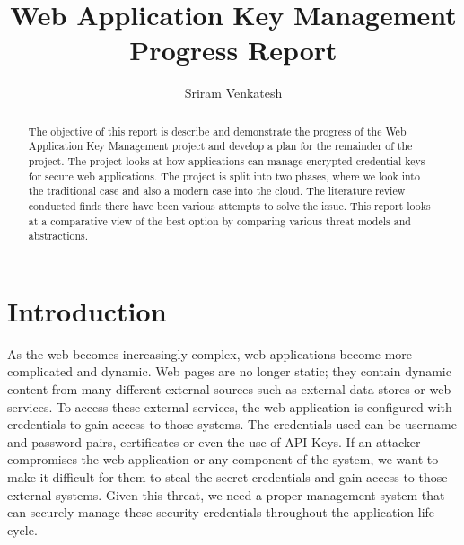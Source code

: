 \documentclass[11pt, a4paper, notitlepage]{article}
\title{Web Application Key Management Progress Report}
\author{Sriram Venkatesh}
\date{}
\begin{document}
\frontmatter


\begin{abstract}
The objective of this report is describe and demonstrate the progress of the Web Application Key Management project and develop a plan for the remainder of the project. The project looks at how applications can manage encrypted credential keys for secure web applications. The project is split into two phases, where we look into the traditional case and also a modern case into the cloud. The literature review conducted finds there have been various attempts to solve the issue. This report looks at a comparative view of the best option by comparing various threat models and abstractions. 
\end{abstract}


\maketitle




\mainmatter


\section{Introduction}
As the web becomes increasingly complex, web applications become more complicated and dynamic. Web pages are no longer static; they contain dynamic content from many different external sources such as external data stores or web services. To access these external services, the web application is configured with credentials to gain access to those systems. The credentials used can be username and password pairs, certificates or even the use of API Keys. If an attacker compromises the web application or any component of the system, we want to make it difficult for them to steal the secret credentials and gain access to those external systems. Given this threat, we need a proper management system that can securely manage these security credentials throughout the application life cycle. \\
\end{document}
